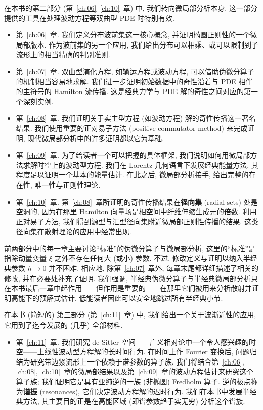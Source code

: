 在本书的第二部分 (第~\ref{ch:06}--\ref{ch:10}~章) 中, 我们转向微局部分析本身. 这一部分提供的工具在处理波动方程等双曲型 PDE 时特别有效.
\begin{itemize}[leftmargin=2em]
    \item 第~\ref{ch:06}~章. 我们定义分布波前集这一核心概念, 并证明椭圆正则性的一个微局部版本. 作为波前集的另一个应用, 我们给出分布可以相乘、或可以限制到子流形上的相当精确的判别准则.
    \item 第~\ref{ch:07}~章. 双曲型演化方程, 如输运方程或波动方程, 可以借助伪微分算子的机制相当容易地求解. 我们进一步证明初始数据中的奇性沿着与 PDE 相伴的主符号的 Hamilton 流传播. 这是经典力学与 PDE 解的奇性之间对应的第一个深刻实例.
    \item 第~\ref{ch:08}~章. 我们证明关于实主型方程 (如波动方程) 解的奇性传播这一著名结果. 我们使用重要的正对易子方法 (positive commutator method) 来完成证明, 现代微局部分析中的许多证明都以它为基础.
    \item 第~\ref{ch:09}~章. 为了给读者一个可以把握的具体框架, 我们说明如何用微局部方法求解时空上的波动型方程. 我们在 Lorentz 几何语言下发展经典能量方法, 其程度足以证明一个基本的能量估计. 在此之后, 微局部分析接手, 给出完整的存在性, 唯一性与正则性理论.
    \item 第~\ref{ch:10}~章. 第~\ref{ch:08}~章所证明的奇性传播结果在\textbf{径向集} (radial sets) 处是空洞的, 因为在那里 Hamilton 向量场是相空间中纤维伸缩生成元的倍数. 利用正对易子方法, 我们得到源型与汇型径向集附近微局部正则性传播的结果. 这类径向集在散射理论的应用中经常出现.
\end{itemize}

前两部分中的每一章主要讨论``标准''的伪微分算子与微局部分析, 这里的``标准''是指除动量变量 $\xi$ 之外不存在任何大 (或小) 参数. 不过, 修改定义与证明以纳入半经典参数 $h \to 0$ 并不困难. 相应地, 除第~\ref{ch:07}~章外, 每章末尾都详细描述了相关的修改, 并在必要处补充了证明. 我们强调, 半经典伪微分算子与半经典微局部分析只在本书最后一章中起作用——但作用是重要的——在那里它们被用来分析散射并证明高能下的预解式估计. 低能读者因此可以安全地跳过所有半经典小节.

在本书 (简短的) 第三部分 (第~\ref{ch:11}~章) 中, 我们给出一个关于波渐近性的应用, 它用到了迄今发展的 (几乎) 全部材料.
\begin{itemize}[leftmargin=2em]
    \item 第~\ref{ch:11}~章. 我们研究 de Sitter 空间——广义相对论中一个令人感兴趣的时空——上线性波动型方程解的长时间行为. 在时间上作 Fourier 变换后, 问题归结为研究带边紧流形上一个依赖于谱参数的算子族. 我们将结合第~\ref{ch:06}, \ref{ch:08}, \ref{ch:10}~章的微局部结果以及第~\ref{ch:09}~章的波动方程估计来研究这个算子族; 我们证明它是具有亚纯逆的一族 (非椭圆) Fredholm 算子. 逆的极点称为\textbf{谐振} (resonances), 它们决定波动方程解的迟时行为. 我们在本书中发展半经典方法, 其主要目的正是在高能区域 (即谱参数趋于实无穷) 分析这个谱族.
\end{itemize}

